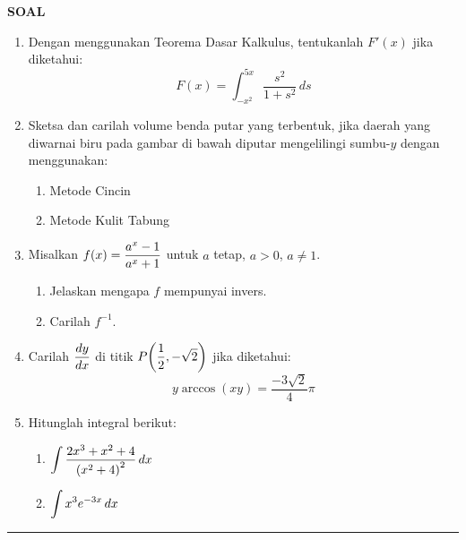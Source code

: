 \begin{center}
\textbf{\large{SOAL}}
\end{center}
\begin{enumerate}[leftmargin=*, label={\arabic*}.]
\item Dengan menggunakan Teorema Dasar Kalkulus, tentukanlah $F'(x)$ jika diketahui:
\[
F(x) = \int_{-x^{2}}^{5x}\frac{s^{2}}{1+s^{2}}\,ds
\]
\item Sketsa dan carilah volume benda putar yang terbentuk, jika daerah yang 
diwarnai biru pada gambar di bawah diputar mengelilingi sumbu-$y$ dengan 
menggunakan:
    \begin{enumerate}[label={\alph*}.]
    \item Metode Cincin
    \item Metode Kulit Tabung
    \end{enumerate}



\item Misalkan $\ds f(x)=\frac{a^{x}-1}{a^{x}+1}$ untuk $a$ tetap, $a>0$, $a\neq 1$.
    \begin{enumerate}[label={\alph*}.]
    \item Jelaskan mengapa $f$ mempunyai invers.
    \item Carilah $f^{-1}$.
    \end{enumerate}
\item Carilah $\ds \frac{dy}{dx}$ di titik $\ds P\brk*{\frac{1}{2},-\sqrt{2}}$ jika diketahui:
\[
y\arccos(xy) = \frac{-3\sqrt{2}}{4}\pi
\]
\item Hitunglah integral berikut:
    \begin{enumerate}[label={\alph*}.]
    \item $\ds \int\frac{2x^{3}+x^{2}+4}{\brk*{x^{2}+4}^{2}}\,dx$
    \item $\ds \int x^{3}e^{-3x}\,dx$
    \end{enumerate}
\end{enumerate}


\vspace{0.2cm}\hrule height 1pt\vspace{0.5cm}



